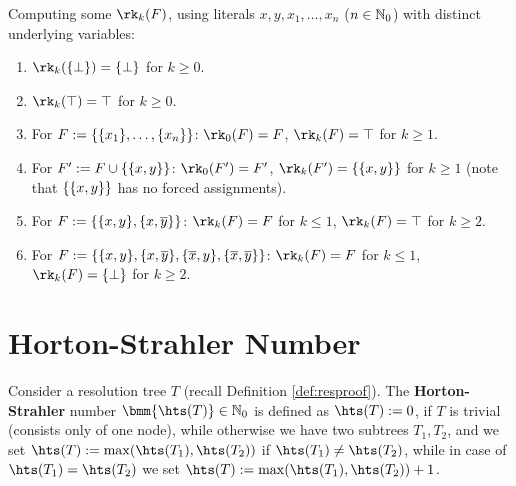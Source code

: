 \documentclass[12pt]{book}
\begin{document}
\begin{examp}\label{exp:rk}
  Computing some $\rk_k(F)$, using literals $x,y,x_1,\dots,x_n$ ($n \in \mathbb{N}_0$) with distinct underlying variables:
  \begin{enumerate}
  \item $\rk_k(\set{\bot}) = \set{\bot}$ for $k \ge 0$.
  \item $\rk_k(\top) = \top$ for $k \ge 0$.
  \item For $F := \{ \{ x_1 \},\dots,\{ x_n \} \}$: $\rk_0(F) = F$, $\rk_k(F) = \top$ for $k \ge 1$.
  \item For $F' := F \cup \{ \{ x,y \} \}$: $\rk_0(F') = F'$, $\rk_k(F') = \set{\set{x,y}}$ for $k \ge 1$ (note that $\{ \{ x,y \} \}$ has no forced assignments).
  \item For $F := \{ \{ x,y \},\{ x,\overline{y} \} \}$: $\rk_k(F) = F$ for $k \le 1$, $\rk_k(F) = \top$ for $k \ge 2$.
  \item For $F := \{ \{ x,y \},\{ x,\overline{y} \}, \{ \overline{x},y \},\{ \overline{x},\overline{y} \} \}$: $\rk_k(F) = F$ for $k \le 1$, $\rk_k(F) = \set{\bot}$ for $k \ge 2$.
  \end{enumerate}
\end{examp}

\section{Horton-Strahler Number}
\label{sec:hs}
\begin{defi}\label{def:hdtree}
  Consider a resolution tree $T$ (recall Definition \ref{def:resproof}). The \textbf{Horton-Strahler} number $\bmm{\hts(T)} \in \NNZ$ is defined as $\hts(T) := 0$, if $T$ is trivial (consists only of one node), while otherwise we have two subtrees $T_1, T_2$, and we set $\hts(T) := \max(\hts(T_1),\hts(T_2))$ if $\hts(T_1) \not= \hts(T_2)$, while in case of $\hts(T_1) = \hts(T_2)$ we set $\hts(T) := \max(\hts(T_1),\hts(T_2)) + 1$.
\end{defi}
\end{document}
